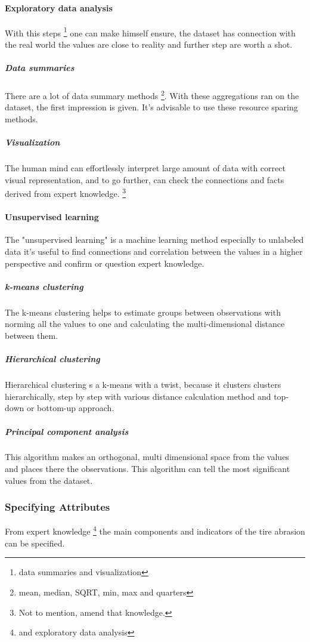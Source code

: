 		\paragraph{Exploratory data analysis}
			With this steps \footnote{data summaries and visualization} one can make himself ensure, the dataset has connection with the real world the values are close to reality and further step are worth a shot.
			\subparagraph{Data summaries}
			There are a lot of data summary methods \footnote{mean, median, SQRT, min, max and quarters}. With these aggregations ran on the dataset, the first impression is given. It's advisable to use these resource sparing methods.
			\subparagraph{Visualization}
			The human mind can effortlessly interpret large amount of data with correct visual representation, and to go further, can check the connections and facts derived from expert knowledge. \footnote{Not to mention, amend that knowledge.} 
		\paragraph{Unsupervised learning}\cite{UnsuplearnBook}
		The "unsupervised learning" is a machine learning method especially to unlabeled data it's useful to find connections and correlation between the values in a higher perspective and confirm or question expert knowledge.

		\subparagraph{k-means clustering}
		\cite{k-means}\cite{kmeans2} The k-means clustering helps to estimate groups between observations with norming all the values to one and calculating the multi-dimensional distance between them.
		\subparagraph{Hierarchical clustering}
		\cite{h-clust}\cite{h-clust2}\cite{Clustering} Hierarchical clustering s a k-means with a twist, because it clusters clusters hierarchically, step by step with various distance calculation method and top-down or bottom-up approach.
		\subparagraph{Principal component analysis}
		\cite{PCA}
		This algorithm makes an orthogonal, multi dimensional space from the values and places there the observations. This algorithm can tell the most significant values from the dataset.
	\subsubsection{Specifying Attributes}
	From expert knowledge \footnote{and exploratory data analysis} the main components and indicators of the tire abrasion can be specified.

